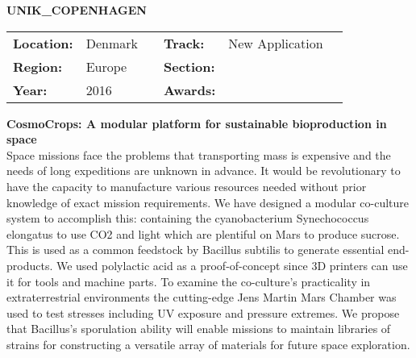 \textbf{\uppercase{UNIK\_Copenhagen}} \FloatBarrier \begin{table}[h] \begin{tabular}{lp{2.5cm}llll} \textbf{Location:} & Denmark & \multicolumn{1}{|l}{} & \textbf{Track:}   & New Application \\ \textbf{Region:}   & Europe   & \multicolumn{1}{|l}{} & \textbf{Section:} &  \\ \textbf{Year:}     & 2016   & \multicolumn{1}{|l}{} & \textbf{Awards:}  & \end{tabular} \end{table} \FloatBarrier \noindent\textbf{CosmoCrops: A modular platform for sustainable bioproduction in space} \vspace{.2cm}\\ 
Space missions face the problems that transporting mass is expensive and the needs of long expeditions are unknown in advance.  It would be revolutionary to have the capacity to manufacture various resources needed without prior knowledge of exact mission requirements.  We have designed a modular co-culture system to accomplish this: containing the cyanobacterium Synechococcus elongatus to use CO2 and light which are plentiful on Mars to produce sucrose.  This is used as a common feedstock by Bacillus subtilis to generate essential end-products.  We used polylactic acid as a proof-of-concept since 3D printers can use it for tools and machine parts.  To examine the co-culture’s practicality in extraterrestrial environments the cutting-edge Jens Martin Mars Chamber was used to test stresses including UV exposure and pressure extremes. We propose that Bacillus’s sporulation ability will enable missions to maintain libraries of strains for constructing a versatile array of materials for future space exploration. 
\vspace{2cm}

